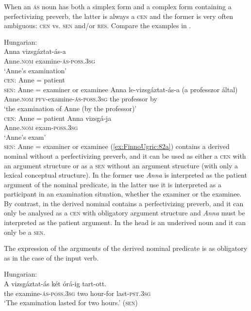 \documentclass[output=paper,hidelinks]{langscibook}
\begin{document}
When an \textsc{ás} noun has both a simplex form and a complex form containing a perfectivizing preverb, the latter is always a \textsc{cen} and the former is very often ambiguous: \textsc{cen} vs. \textsc{sen} and/or \textsc{res}. Compare the examples in .



\ea%
\label{ex:FinnoUgric:82}Hungarian:\\
\ea\label{ex:FinnoUgric:82a}
\gll Anna vizsgáztat-ás-a\\
     Anne.\textsc{nom} examine-\textsc{ás-poss.3sg}\\
     \glt `Anne's examination'\\
\textsc{cen}: Anne = patient\\
\textsc{sen}: Anne = examiner or examinee
\ex\label{ex:FinnoUgric:82b}
\gll Anna le-vizsgáztat\nobreakdash-ás\nobreakdash-a (a professzor által)\\
Anne.\textsc{nom} \textsc{pfv}{}-examine\nobreakdash-\textsc{ás\nobreakdash-poss.3sg} the professor by\\
\glt `the examination of Anne (by the professor)'\\
\textsc{cen:} Anne = patient
\ex \label{ex:FinnoUgric:82c}
\gll Anna vizsgá\nobreakdash-ja\\
Anne.\textsc{nom} exam\textsc{\nobreakdash-poss.3sg}\\
\glt `Anne's exam'\\
    \textsc{sen}: Anne = examiner or examinee
\z
\z
(\ref{ex:FinnoUgric:82a}) contains a derived nominal without a perfectivizing preverb, and it can be used as either a \textsc{cen} with an argument structure or as a \textsc{sen} without an argument structure (with only a lexical conceptual structure). In the former use \textit{Anna} is interpreted as the patient argument of the nominal predicate, in the latter use it is interpreted as a participant in an examination situation, whether the examiner or the examinee. By contrast, in  the derived nominal contains a perfectivizing preverb, and it can only be analysed as a \textsc{cen} with obligatory argument structure and \textit{Anna} must be interpreted as the patient argument. In  the head is an underived noun and it can only be a \textsc{sen}. 


The expression of the arguments of the derived nominal predicate is as obligatory as in the case of the input verb.



\ea%
    \label{ex:FinnoUgric:83}Hungarian:\\
    \gll A vizsgáztat-ás két órá-ig tart-ott.\\
        the examine-\textsc{ás-poss.3sg} two hour-for last-\textsc{pst.3sg}\\
    \glt `The examination lasted for two hours.' (\textsc{sen})
    \z
\end{document}
